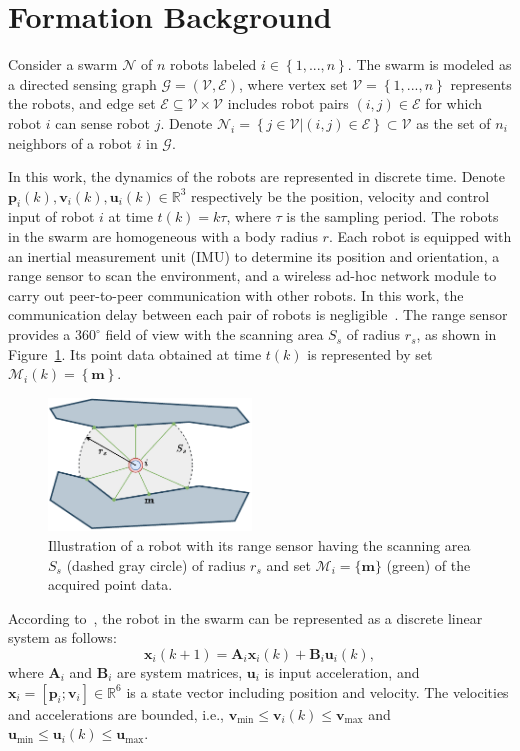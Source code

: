 \section{Formation Background}\label{sec:problem}
Consider a swarm $\mathcal{N}$ of $n$ robots labeled $i\in\left\{1,...,n\right\}$. The swarm is modeled as a directed sensing graph $\mathcal{G}=\left(\mathcal{V},\mathcal{E}\right)$, where vertex set $\mathcal{V} = \left\{1,..., n\right\}$ represents the robots, and edge set $\mathcal{E}\subseteq\mathcal{V}\times \mathcal{V}$ includes robot pairs $\left(i, j\right)\in\mathcal{E}$ for which robot $i$ can sense robot $j$. Denote $\mathcal{N}_i=\left\{j\in\mathcal{V}|\left(i,j\right)\in\mathcal{E}\right\}\subset\mathcal{V}$ as the set of $n_i$ neighbors of a robot $i$ in $\mathcal{G}$.

In this work, the dynamics of the robots are represented in discrete time. Denote $\mathbf{p}_i(k),\mathbf{v}_i(k),\mathbf{u}_i(k)\in\mathbb{R}^3$ respectively be the position, velocity and control input of robot $i$ at time $t(k) = k\tau$, where $\tau$ is the sampling period. The robots in the swarm are homogeneous with a body radius $r$. Each robot is equipped with an inertial measurement unit (IMU) to determine its position and orientation, a range sensor to scan the environment, and a wireless ad-hoc network module to carry out peer-to-peer communication with other robots. In this work, the communication delay between each pair of robots is negligible~\cite{AlonsoMora2018,9527169}. The range sensor provides a $360^\circ$ field of view with the scanning area $S_s$ of radius $r_s$, as shown in Figure~\ref{fig:model}. Its point data obtained at time $t(k)$ is represented by set $\mathcal{M}_i(k)=\left\{\mathbf{m}\right\}$.
\begin{figure}
    \centering
    \includegraphics[width=0.48\textwidth]{paper3/images/model.pdf}
    \caption{Illustration of a robot with its range sensor having the scanning area $S_s$ (dashed gray circle) of radius $r_s$ and set $\mathcal{M}_i=\{\mathbf{m}\}$ (green) of the acquired point data.}
    \label{fig:model}
\end{figure}

According to~\cite{Soria2021}, the robot in the swarm can be represented as a discrete linear system as follows:
\begin{equation}
    \mathbf{x}_i(k+1)=\mathbf{A}_i\mathbf{x}_i(k) + \mathbf{B}_i\mathbf{u}_i(k),
\end{equation}
where $\mathbf{A}_i$ and $\mathbf{B}_i$ are system matrices, $\mathbf{u}_i$ is input acceleration, and $\mathbf{x}_i=\left[\mathbf{p}_i;\mathbf{v}_i\right]\in\mathbb{R}^6$ is a state vector including position and velocity. The velocities and accelerations are bounded, i.e., $\mathbf{v}_\text{min}\leq \mathbf{v}_i(k)\leq \mathbf{v}_\text{max}$ and $\mathbf{u}_\text{min}\leq \mathbf{u}_i(k)\leq \mathbf{u}_\text{max}$.
